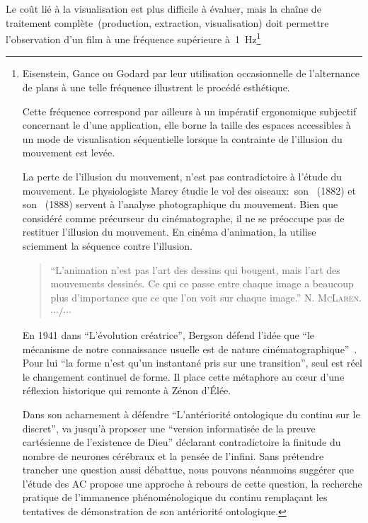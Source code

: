 Le co\^ut li\'e \`a la visualisation est plus difficile \`a \'evaluer, mais la
cha\^ine de traitement compl\`ete~(production, extraction, visualisation)
doit permettre l'observation d'un film \`a une fr\'equence sup\'erieure
\`a~1~Hz\footnote{%
  Eisenstein, Gance ou Godard par leur utilisation occasionnelle de
  l'alternance de plans \`a une telle fr\'equence illustrent le proc\'ed\'e
  esth\'etique. %

  Cette fr\'equence correspond par ailleurs \`a un imp\'eratif ergonomique
  subjectif concernant le  d'une application,
  elle borne la taille des espaces accessibles \`a un mode de
  visualisation s\'equentielle lorsque la contrainte de l'illusion du
  mouvement est lev\'ee. %
  
  La perte de l'illusion du mouvement, n'est pas contradictoire \`a
  l'\'etude du mouvement. %
  Le physiologiste Marey \'etudie le vol des oiseaux:~son %
  ~(1882) et son %
  ~(1888) %
  servent \`a l'analyse photographique du mouvement. %
  Bien que consid\'er\'e comme pr\'ecurseur du cin\'ematographe,
  il ne se pr\'eoccupe pas de restituer l'illusion du mouvement. %
  En cin\'ema d'animation, la  utilise sciemment
  la s\'equence contre l'illusion. %
  \begin{quote}
    ``L'animation n'est pas l'art des dessins qui bougent, mais l'art des
    mouvements dessin\'es. %
    Ce qui ce passe entre chaque image a beaucoup plus d'importance que
    ce que l'on voit sur chaque image.'' \textsc{N. McLaren}.{\hfill$\cdots/\cdots$}%
  \end{quote}
  En 1941 dans ``L'\'evolution cr\'eatrice'', Bergson
  d\'efend l'id\'ee que ``le m\'ecanisme de notre connaissance usuelle est
  de nature cin\'ematographique''~\cite[page 305]{Bergson89}. %
  Pour lui ``la forme n'est qu'un instantan\'e pris sur une
  transition'', seul est r\'eel le changement continuel de forme. %
  Il place cette m\'etaphore au c{\oe}ur d'une r\'eflexion historique qui
  remonte \`a Z\'enon d'\'El\'ee. %

  Dans son acharnement \`a d\'efendre ``L'ant\'eriorit\'e ontologique du
  continu sur le discret'', \cite{Thom92} va jusqu'\`a proposer
  une ``version informatis\'ee de la preuve cart\'esienne de
  l'existence de Dieu'' d\'eclarant contradictoire la finitude du nombre
  de neurones c\'er\'ebraux et la pens\'ee de l'infini. %
  Sans pr\'etendre trancher une question aussi d\'ebattue, nous pouvons
  n\'eanmoins sugg\'erer que l'\'etude des AC propose une approche \`a rebours
  de cette question, la recherche pratique de l'immanence
  ph\'enom\'enologique du continu rempla\c{c}ant les tentatives de
  d\'emonstration de son ant\'eriorit\'e ontologique. %

}
